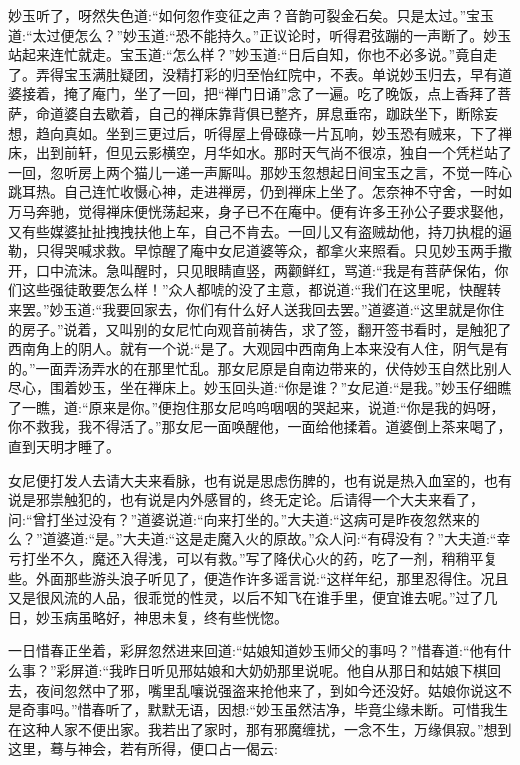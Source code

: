 \begin{parag}
    妙玉听了，呀然失色道:“如何忽作变征之声？音韵可裂金石矣。只是太过。”宝玉道:“太过便怎么？”妙玉道:“恐不能持久。”正议论时，听得君弦蹦的一声断了。妙玉站起来连忙就走。宝玉道:“怎么样？”妙玉道:“日后自知，你也不必多说。”竟自走了。弄得宝玉满肚疑团，没精打彩的归至怡红院中，不表。单说妙玉归去，早有道婆接着，掩了庵门，坐了一回，把“禅门日诵”念了一遍。吃了晚饭，点上香拜了菩萨，命道婆自去歇着，自己的禅床靠背俱已整齐，屏息垂帘，跏趺坐下，断除妄想，趋向真如。坐到三更过后，听得屋上骨碌碌一片瓦响，妙玉恐有贼来，下了禅床，出到前轩，但见云影横空，月华如水。那时天气尚不很凉，独自一个凭栏站了一回，忽听房上两个猫儿一递一声厮叫。那妙玉忽想起日间宝玉之言，不觉一阵心跳耳热。自己连忙收慑心神，走进禅房，仍到禅床上坐了。怎奈神不守舍，一时如万马奔驰，觉得禅床便恍荡起来，身子已不在庵中。便有许多王孙公子要求娶他，又有些媒婆扯扯拽拽扶他上车，自己不肯去。一回儿又有盗贼劫他，持刀执棍的逼勒，只得哭喊求救。早惊醒了庵中女尼道婆等众，都拿火来照看。只见妙玉两手撒开，口中流沫。急叫醒时，只见眼睛直竖，两颧鲜红，骂道:“我是有菩萨保佑，你们这些强徒敢要怎么样！”众人都唬的没了主意，都说道:“我们在这里呢，快醒转来罢。”妙玉道:“我要回家去，你们有什么好人送我回去罢。”道婆道:“这里就是你住的房子。”说着，又叫别的女尼忙向观音前祷告，求了签，翻开签书看时，是触犯了西南角上的阴人。就有一个说:“是了。大观园中西南角上本来没有人住，阴气是有的。”一面弄汤弄水的在那里忙乱。那女尼原是自南边带来的，伏侍妙玉自然比别人尽心，围着妙玉，坐在禅床上。妙玉回头道:“你是谁？”女尼道:“是我。”妙玉仔细瞧了一瞧，道:“原来是你。”便抱住那女尼呜呜咽咽的哭起来，说道:“你是我的妈呀，你不救我，我不得活了。”那女尼一面唤醒他，一面给他揉着。道婆倒上茶来喝了，直到天明才睡了。
\end{parag}


\begin{parag}
    女尼便打发人去请大夫来看脉，也有说是思虑伤脾的，也有说是热入血室的，也有说是邪祟触犯的，也有说是内外感冒的，终无定论。后请得一个大夫来看了，问:“曾打坐过没有？”道婆说道:“向来打坐的。”大夫道:“这病可是昨夜忽然来的么？”道婆道:“是。”大夫道:“这是走魔入火的原故。”众人问:“有碍没有？”大夫道:“幸亏打坐不久，魔还入得浅，可以有救。”写了降伏心火的药，吃了一剂，稍稍平复些。外面那些游头浪子听见了，便造作许多谣言说:“这样年纪，那里忍得住。况且又是很风流的人品，很乖觉的性灵，以后不知飞在谁手里，便宜谁去呢。”过了几日，妙玉病虽略好，神思未复，终有些恍惚。
\end{parag}


\begin{parag}
    一日惜春正坐着，彩屏忽然进来回道:“姑娘知道妙玉师父的事吗？”惜春道:“他有什么事？”彩屏道:“我昨日听见邢姑娘和大奶奶那里说呢。他自从那日和姑娘下棋回去，夜间忽然中了邪，嘴里乱嚷说强盗来抢他来了，到如今还没好。姑娘你说这不是奇事吗。”惜春听了，默默无语，因想:“妙玉虽然洁净，毕竟尘缘未断。可惜我生在这种人家不便出家。我若出了家时，那有邪魔缠扰，一念不生，万缘俱寂。”想到这里，蓦与神会，若有所得，便口占一偈云:
\end{parag}

